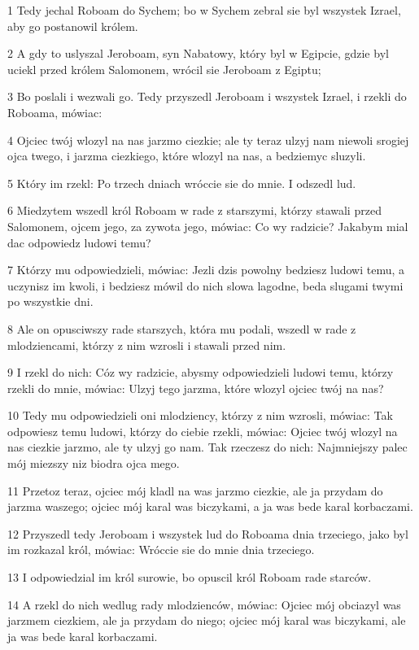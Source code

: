\par 1 Tedy jechal Roboam do Sychem; bo w Sychem zebral sie byl wszystek Izrael, aby go postanowil królem.
\par 2 A gdy to uslyszal Jeroboam, syn Nabatowy, który byl w Egipcie, gdzie byl uciekl przed królem Salomonem, wrócil sie Jeroboam z Egiptu;
\par 3 Bo poslali i wezwali go. Tedy przyszedl Jeroboam i wszystek Izrael, i rzekli do Roboama, mówiac:
\par 4 Ojciec twój wlozyl na nas jarzmo ciezkie; ale ty teraz ulzyj nam niewoli srogiej ojca twego, i jarzma ciezkiego, które wlozyl na nas, a bedziemyc sluzyli.
\par 5 Który im rzekl: Po trzech dniach wróccie sie do mnie. I odszedl lud.
\par 6 Miedzytem wszedl król Roboam w rade z starszymi, którzy stawali przed Salomonem, ojcem jego, za zywota jego, mówiac: Co wy radzicie? Jakabym mial dac odpowiedz ludowi temu?
\par 7 Którzy mu odpowiedzieli, mówiac: Jezli dzis powolny bedziesz ludowi temu, a uczynisz im kwoli, i bedziesz mówil do nich slowa lagodne, beda slugami twymi po wszystkie dni.
\par 8 Ale on opusciwszy rade starszych, która mu podali, wszedl w rade z mlodziencami, którzy z nim wzrosli i stawali przed nim.
\par 9 I rzekl do nich: Cóz wy radzicie, abysmy odpowiedzieli ludowi temu, którzy rzekli do mnie, mówiac: Ulzyj tego jarzma, które wlozyl ojciec twój na nas?
\par 10 Tedy mu odpowiedzieli oni mlodziency, którzy z nim wzrosli, mówiac: Tak odpowiesz temu ludowi, którzy do ciebie rzekli, mówiac: Ojciec twój wlozyl na nas ciezkie jarzmo, ale ty ulzyj go nam. Tak rzeczesz do nich: Najmniejszy palec mój miezszy niz biodra ojca mego.
\par 11 Przetoz teraz, ojciec mój kladl na was jarzmo ciezkie, ale ja przydam do jarzma waszego; ojciec mój karal was biczykami, a ja was bede karal korbaczami.
\par 12 Przyszedl tedy Jeroboam i wszystek lud do Roboama dnia trzeciego, jako byl im rozkazal król, mówiac: Wróccie sie do mnie dnia trzeciego.
\par 13 I odpowiedzial im król surowie, bo opuscil król Roboam rade starców.
\par 14 A rzekl do nich wedlug rady mlodzienców, mówiac: Ojciec mój obciazyl was jarzmem ciezkiem, ale ja przydam do niego; ojciec mój karal was biczykami, ale ja was bede karal korbaczami.
